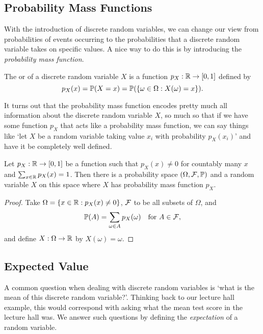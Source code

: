 \documentclass[10pt, a4paper]{article}
\begin{document}
\clearpage

\subsection{Probability Mass Functions}

With the introduction of discrete random variables, we can change our view from probabilities of events occurring to the probabilities that a discrete random variable takes on specific values. A nice way to do this is by introducing the \emph{probability mass function}.

\begin{definition}
	The  or  of a discrete random variable $X$ is a function $p_X: \mathbb{R} \rightarrow [0, 1]$ defined by
	$$
	p_X(x) = \mathbb{P}(X = x) = \mathbb{P}(\{ \omega \in \Omega : X(\omega) = x\}).
	$$
\end{definition}

It turns out that the probability mass function encodes pretty much all information about the discrete random variable $X$, so much so that if we have some function $p_X$ that acts like a probability mass function, we can say things like `let $X$ be a random variable taking value $x_i$ with probability $p_X(x_i)$' and have it be completely well defined.

\begin{theorem}
	Let $p_X : \mathbb{R} \rightarrow [0, 1]$ be a function such that $p_X(x) \neq 0$ for countably many $x$ and $\sum_{x \in \mathbb{R}} p_X(x) = 1$. Then there is a probability space $(\Omega, \mathcal{F}, \mathbb{P})$ and a random variable $X$ on this space where $X$ has probability mass function $p_X$.
\end{theorem}
\begin{proof}
	Take $\Omega = \{x \in \mathbb{R} : p_X(x) \neq 0\}$, $\mathcal{F}$ to be all subsets of $\Omega$, and 
	$$
	\mathbb{P}(A) = \sum_{\omega \in A} p_X(\omega) \quad \text{for }A \in \mathcal{F},
	$$
	and define $X : \Omega \rightarrow \mathbb{R}$ by $X(\omega) = \omega$.
\end{proof}


\subsection{Expected Value}

A common question when dealing with discrete random variables is `what is the mean of this discrete random variable?'. Thinking back to our 
lecture hall example, this would correspond with asking what the mean test score in the lecture hall was.
We answer such questions by defining the \emph{expectation} of a random variable.
\end{document}
